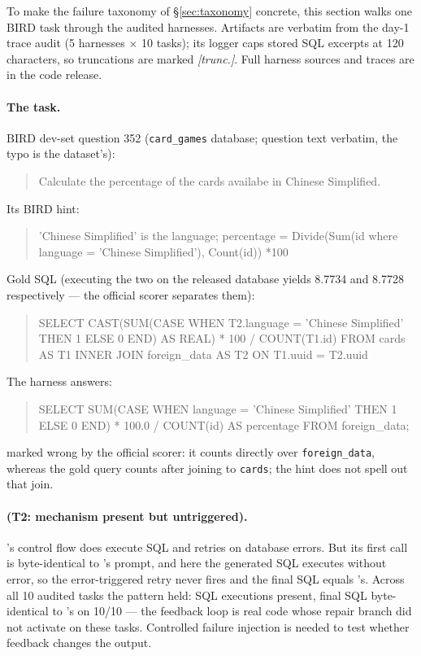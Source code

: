 To make the failure taxonomy of \S\ref{sec:taxonomy} concrete, this section
walks one BIRD task through the audited harnesses. Artifacts are verbatim
from the day-1 trace audit (5 harnesses $\times$ 10 tasks); its logger caps
stored SQL excerpts at 120 characters, so truncations are marked
\emph{[trunc.]}. Full harness sources and traces are in the code release.

\paragraph{The task.} BIRD dev-set question 352 (\texttt{card\_games}
database; question text verbatim, the typo is the dataset's):
\begin{quote}\small\ttfamily
Calculate the percentage of the cards availabe in Chinese Simplified.
\end{quote}
Its BIRD hint:
\begin{quote}\small\ttfamily
'Chinese Simplified' is the language; percentage = Divide(Sum(id where
language = 'Chinese Simplified'), Count(id)) *100
\end{quote}
Gold SQL (executing the two on the released database yields 8.7734 and
8.7728 respectively --- the official scorer separates them):
\begin{quote}\small\ttfamily
SELECT CAST(SUM(CASE WHEN T2.language = 'Chinese Simplified' THEN 1 ELSE 0
END) AS REAL) * 100 / COUNT(T1.id) FROM cards AS T1 INNER JOIN foreign\_data
AS T2 ON T1.uuid = T2.uuid
\end{quote}
The \bare{} harness answers:
\begin{quote}\small\ttfamily
SELECT SUM(CASE WHEN language = 'Chinese Simplified' THEN 1 ELSE 0 END) *
100.0 / COUNT(id) AS percentage FROM foreign\_data;
\end{quote}
marked wrong by the official scorer: it counts directly over
\texttt{foreign\_data}, whereas the gold query counts after joining to
\texttt{cards}; the hint does not spell out that join.

\paragraph{\react{} (T2: mechanism present but untriggered).} \react's control
flow does execute SQL and retries on database errors. But its first call is
byte-identical to \bare's prompt, and here the generated SQL executes without
error, so the error-triggered retry never fires and the final SQL equals
\bare's. Across all 10 audited tasks the pattern held: SQL executions
present, final SQL byte-identical to \bare's on 10/10 --- the feedback loop
is real code whose repair branch did not activate on these tasks. Controlled
failure injection is needed to test whether feedback changes the output.

